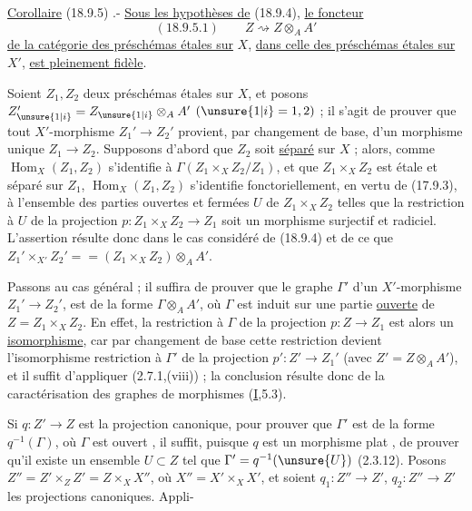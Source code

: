 \uline{Corollaire} (18.9.5) .- \uline{Sous les hypothèses de} (18.9.4), \uline{le foncteur}
\[
(18.9.5.1)\qquad Z\rightsquigarrow Z\otimes_A A'
\]
\uline{de la catégorie des préschémas étales sur} $X$, \uline{dans celle des préschémas étales sur} $X'$, \uline{est pleinement fidèle}.

Soient $Z_1,Z_2$ deux préschémas étales sur $X$, et posons $Z_{\unsure{1|i}}'=Z_{\unsure{1|i}}\otimes_A A'$ $(\unsure{1|i}=1,2)$ ;  il s'agit de prouver que tout $X'$-morphisme $Z_1'\to Z_2'$ provient, par changement de base, d'un morphisme unique $Z_1\to Z_2$. Supposons d'abord que  $Z_2$ soit \uline{séparé} sur $X$ ; alors, comme $\operatorname{Hom}_X(Z_1,Z_2)$ s'identifie à  $\Gamma(Z_1\times_X Z_2/Z_1)$, et que $Z_1\times_X Z_2$ est étale et séparé sur $Z_1$, $\operatorname{Hom}_X(Z_1,Z_2)$ s'identifie fonctoriellement, en vertu de (17.9.3), à l'ensemble des parties ouvertes et fermées $U$ de $Z_1\times_X Z_2$ telles que la restriction à $U$ de la projection $p:Z_1\times_X Z_2\to Z_1$ soit un morphisme surjectif et radiciel. L'assertion résulte donc dans le cas considéré de (18.9.4) et de ce que $Z_1'\times_{X'}Z_2'= {}=(Z_1\times_X Z_2)\otimes_A A'$.

Passons au cas général ; il suffira de prouver que le graphe $\Gamma'$ d'un $X'$-morphisme $Z_1'\to Z_2'$,  est de la forme $\Gamma\otimes_A A'$, où $\Gamma$ est  induit sur une partie \uline{ouverte} de $Z=Z_1\times_X Z_2$. En effet, la restriction à $\Gamma$ de la projection $p:Z\to Z_1$ est alors un \uline{isomorphisme}, car par changement de base  cette restriction devient l'isomorphisme restriction à $\Gamma'$ de la projection $p':Z'\to Z_1'$ (avec $Z'=Z\otimes_A A'$), et il suffit d'appliquer (2.7.1,(viii)) ; la conclusion résulte donc  de la caractérisation des graphes de morphismes (\uline{I},5.3).

Si $q:Z'\to Z$ est la projection canonique, pour prouver que $\Gamma'$ est de la forme  $q^{-1}(\Gamma)$, où $\Gamma$ est ouvert , il suffit, puisque $q$ est un morphisme  plat , de prouver  qu'il existe un ensemble $U\subset Z$ tel que $\Gamma'=q^{-1}(\unsure{U})$ (2.3.12). Posons $Z''=Z'\times_Z Z'=Z\times_X X''$, où $X''=X'\times_X X'$, et soient $q_1:Z''\to Z'$, $q_2:Z''\to Z'$ les projections canoniques. Appli-
